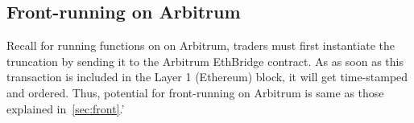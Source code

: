  
	
\subsection{Front-running on Arbitrum}
\label{sec:frontarb}

Recall for running functions on \cm on Arbitrum, traders must first instantiate the truncation by sending it to the Arbitrum EthBridge contract. As as soon as this transaction is included in the Layer 1 (Ethereum) block, it will get time-stamped and ordered. Thus, potential for front-running on Arbitrum is same as those explained in~\ref{sec:front}.'






